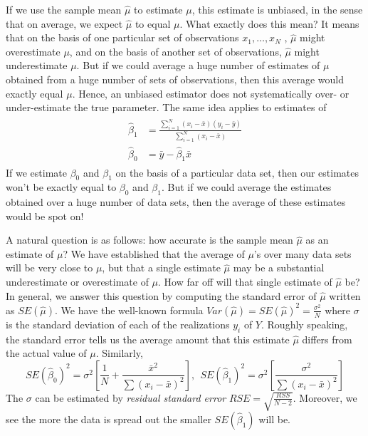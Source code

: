 If we use the sample mean $\hat \mu $ to estimate $\mu$, 
this estimate is unbiased, in the sense that on average, 
we expect $\hat \mu$ to equal  $\mu$. 
What exactly does this mean? It means that on the basis 
of one particular set of observations $x_1, \dots, x_N$ , $\hat \mu$ might overestimate 
$\mu$, and on the basis of another set of observations, $\hat \mu$ 
might underestimate $\mu$. But if we could average a huge number of 
estimates of $\mu$ obtained from a huge number of sets of observations, then 
this average would exactly equal $\mu$. Hence, an unbiased 
estimator does not systematically over- or under-estimate the true parameter.
The same idea applies to estimates of 
\begin{gather} %
\begin{aligned}
\hat \beta_1 &= \frac{\sum_{i=1}^N (x_i - \bar x) (y_i - \bar y)}{ \sum_{i=1}^N (x_i - \bar x)  } \\
\hat \beta_0 &= \bar y - \hat \beta_1 \bar x
\end{aligned}
\end{gather} 
If we estimate $\beta_0$ and $\beta_1$ on the basis of a particular 
data set, then our estimates won’t be exactly equal to $\beta_0$ and $\beta_1$. 
But if we could average the estimates obtained over a huge 
number of data sets, then the average of these estimates 
would be spot on! 

A natural question is as follows: how accurate is the 
sample mean $\hat \mu$ as an estimate of $\mu$? We have 
established that the average of $\mu$'s over many data sets will be 
very close to $\mu$, but that a single estimate $\hat \mu$ may be a 
substantial underestimate or overestimate of $\mu$. How far off will that 
single estimate of $\hat \mu$ be? 
In general, we answer this question by computing the 
standard error of $\hat \mu$ written as $SE (\hat \mu)$. We have the 
well-known formula $Var(\hat \mu) = SE(\hat \mu)^2 = \frac{\sigma^2}{N}$
where $\sigma$ is the standard deviation of each of the realizations $y_i$ 
of $Y$.
Roughly speaking, the standard error tells us the average 
amount that this estimate $\hat \mu$ differs from the actual value of $\mu$.
Similarly,
\begin{equation}
SE(\hat \beta_0)^2 = \sigma^2 \left[  \frac{1}{N} + \frac{\bar x^2}{\sum (x_i - \bar x)^2}    \right],~~
SE(\hat \beta_1)^2 = \sigma^2 \left[  \frac{\sigma^2}{\sum (x_i - \bar x)^2}    \right]
\end{equation}
The $\sigma$ can be estimated by \emph{residual standard error} $RSE = \sqrt{\frac{RSS}{N-2}}$. Moreover, we see the more the data is spread
out the smaller $SE(\hat \beta_1)$ will be. 

